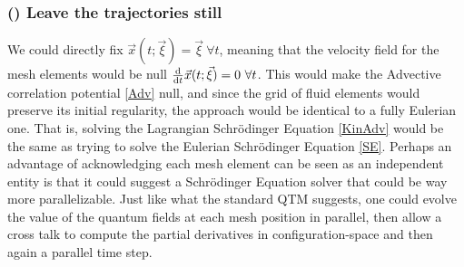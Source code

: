 \documentclass[11pt, a4paper]{article} %
\begin{document}
\subsubsection*{\bf (\textalpha) Leave the trajectories still}
 We could directly fix $\vec{x}(t;\vec{\xi})=\vec{\xi}\ \forall t$, meaning that the velocity field for the mesh elements would be null $\dv{}{t}\vec{x}(t;\vec{\xi})=0\ \forall t$. This would make the Advective correlation potential \eqref{Adv} null, and since the grid of fluid elements would preserve its initial regularity, the approach would be identical to a fully Eulerian one. That is, solving the Lagrangian Schrödinger Equation \eqref{KinAdv} would be the same as trying to solve the Eulerian Schrödinger Equation \eqref{SE}. Perhaps an advantage of acknowledging each mesh element can be seen as an independent entity is that it could suggest a Schrödinger Equation solver that could be way more parallelizable. Just like what the standard QTM suggests, one could evolve the value of the quantum fields at each mesh position in parallel, then allow a cross talk to compute the partial derivatives in configuration-space and then again a parallel time step.
\end{document}
